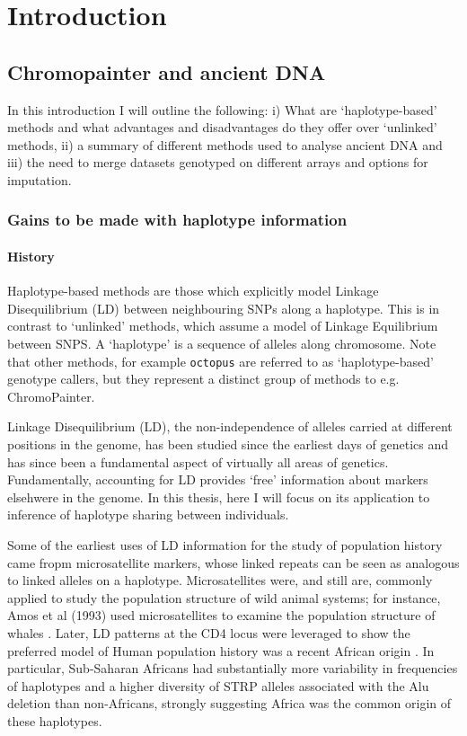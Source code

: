 \chapter{Introduction}

\section{Chromopainter and ancient DNA}

In this introduction I will outline the following: i) What are `haplotype-based' methods and what advantages and disadvantages do they offer over `unlinked' methods, ii) a summary of different methods used to analyse ancient DNA and iii) the need to merge datasets genotyped on different arrays and options for imputation. 

\subsection{Gains to be made with haplotype information}

\subsubsection{History}

Haplotype-based methods are those which explicitly model Linkage Disequilibrium (LD) between neighbouring SNPs along a haplotype. This is in contrast to `unlinked' methods, which assume a model of Linkage Equilibrium between SNPS. A `haplotype' is a sequence of alleles along chromosome. Note that other methods, for example \texttt{octopus} \cite{octopus} are referred to as `haplotype-based' genotype callers, but they represent a distinct group of methods to e.g. ChromoPainter.  

Linkage Disequilibrium (LD), the non-independence of alleles carried at different positions in the genome, has been studied since the earliest days of genetics \cite{morgan1912complete, bateson1902experiments} and has since been a fundamental aspect of virtually all areas of genetics. Fundamentally, accounting for LD provides `free' information about markers elsehwere in the genome. In this thesis, here I will focus on its application to inference of haplotype sharing between individuals. 

Some of the earliest uses of LD information for the study of population history came fropm microsatellite markers, whose linked repeats can be seen as analogous to linked alleles on a haplotype. Microsatellites were, and still are, commonly applied to study the population structure of wild animal systems; for instance, Amos et al (1993) used microsatellites to examine the population structure of whales \cite{amos1993social}. Later, LD  patterns at the CD4 locus were leveraged to show the preferred model of Human population history was a recent African origin \cite{tishkoff1996global}. In particular, Sub-Saharan Africans had substantially more variability in frequencies of haplotypes and a higher diversity of STRP alleles associated with the Alu deletion than non-Africans, strongly suggesting Africa was the common origin of these haplotypes. 

